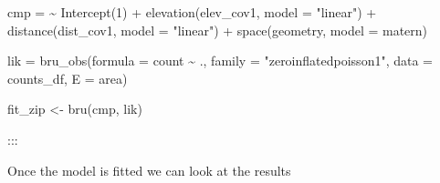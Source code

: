 \documentclass[
  letterpaper,
  DIV=11,
  numbers=noendperiod]{scrartcl}
\newenvironment{Shaded}{\begin{snugshade}}{\end{snugshade}}
\newcommand{\AttributeTok}[1]{\textcolor[rgb]{0.40,0.45,0.13}{#1}}
\newcommand{\DecValTok}[1]{\textcolor[rgb]{0.68,0.00,0.00}{#1}}
\newcommand{\ErrorTok}[1]{\textcolor[rgb]{0.68,0.00,0.00}{#1}}
\newcommand{\FunctionTok}[1]{\textcolor[rgb]{0.28,0.35,0.67}{#1}}
\newcommand{\NormalTok}[1]{\textcolor[rgb]{0.00,0.23,0.31}{#1}}
\newcommand{\OtherTok}[1]{\textcolor[rgb]{0.00,0.23,0.31}{#1}}
\newcommand{\SpecialCharTok}[1]{\textcolor[rgb]{0.37,0.37,0.37}{#1}}
\newcommand{\StringTok}[1]{\textcolor[rgb]{0.13,0.47,0.30}{#1}}
\begin{document}
\begin{Shaded}
\begin{Highlighting}[]

\NormalTok{cmp }\OtherTok{=} \ErrorTok{\textasciitilde{}} \FunctionTok{Intercept}\NormalTok{(}\DecValTok{1}\NormalTok{) }\SpecialCharTok{+} \FunctionTok{elevation}\NormalTok{(elev\_cov1, }\AttributeTok{model =} \StringTok{"linear"}\NormalTok{) }\SpecialCharTok{+} \FunctionTok{distance}\NormalTok{(dist\_cov1, }\AttributeTok{model =} \StringTok{"linear"}\NormalTok{) }\SpecialCharTok{+} \FunctionTok{space}\NormalTok{(geometry, }\AttributeTok{model =}\NormalTok{ matern)}



\NormalTok{lik }\OtherTok{=} \FunctionTok{bru\_obs}\NormalTok{(}\AttributeTok{formula =}\NormalTok{ count }\SpecialCharTok{\textasciitilde{}}\NormalTok{ .,}
    \AttributeTok{family =} \StringTok{"zeroinflatedpoisson1"}\NormalTok{, }
    \AttributeTok{data =}\NormalTok{ counts\_df,}
    \AttributeTok{E =}\NormalTok{ area)}

\NormalTok{fit\_zip }\OtherTok{\textless{}{-}} \FunctionTok{bru}\NormalTok{(cmp, lik)}
\end{Highlighting}
\end{Shaded}

:::

Once the model is fitted we can look at the results
\end{document}
